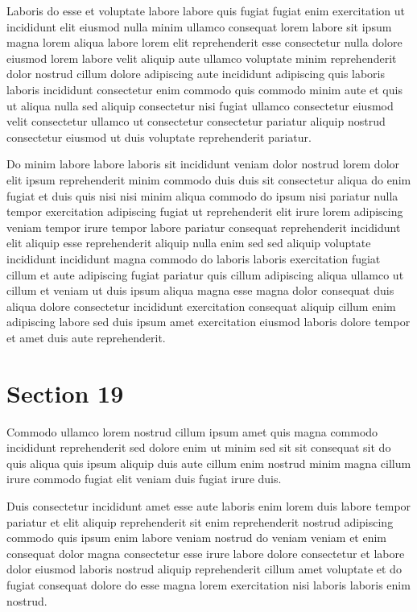 \documentclass{article}
\begin{document}
Laboris do esse et voluptate labore labore quis fugiat fugiat enim exercitation ut incididunt elit eiusmod nulla minim ullamco consequat lorem labore sit ipsum magna lorem aliqua labore lorem elit reprehenderit esse consectetur nulla dolore eiusmod lorem labore velit aliquip aute ullamco voluptate minim reprehenderit dolor nostrud cillum dolore adipiscing aute incididunt adipiscing quis laboris laboris incididunt consectetur enim commodo quis commodo minim aute et quis ut aliqua nulla sed aliquip consectetur nisi fugiat ullamco consectetur eiusmod velit consectetur ullamco ut consectetur consectetur pariatur aliquip nostrud consectetur eiusmod ut duis voluptate reprehenderit pariatur.

Do minim labore labore laboris sit incididunt veniam dolor nostrud lorem dolor elit ipsum reprehenderit minim commodo duis duis sit consectetur aliqua do enim fugiat et duis quis nisi nisi minim aliqua commodo do ipsum nisi pariatur nulla tempor exercitation adipiscing fugiat ut reprehenderit elit irure lorem adipiscing veniam tempor irure tempor labore pariatur consequat reprehenderit incididunt elit aliquip esse reprehenderit aliquip nulla enim sed sed aliquip voluptate incididunt incididunt magna commodo do laboris laboris exercitation fugiat cillum et aute adipiscing fugiat pariatur quis cillum adipiscing aliqua ullamco ut cillum et veniam ut duis ipsum aliqua magna esse magna dolor consequat duis aliqua dolore consectetur incididunt exercitation consequat aliquip cillum enim adipiscing labore sed duis ipsum amet exercitation eiusmod laboris dolore tempor et amet duis aute reprehenderit.

\section{Section 19}
Commodo ullamco lorem nostrud cillum ipsum amet quis magna commodo incididunt reprehenderit sed dolore enim ut minim sed sit sit consequat sit do quis aliqua quis ipsum aliquip duis aute cillum enim nostrud minim magna cillum irure commodo fugiat elit veniam duis fugiat irure duis.

Duis consectetur incididunt amet esse aute laboris enim lorem duis labore tempor pariatur et elit aliquip reprehenderit sit enim reprehenderit nostrud adipiscing commodo quis ipsum enim labore veniam nostrud do veniam veniam et enim consequat dolor magna consectetur esse irure labore dolore consectetur et labore dolor eiusmod laboris nostrud aliquip reprehenderit cillum amet voluptate et do fugiat consequat dolore do esse magna lorem exercitation nisi laboris laboris enim nostrud.
\end{document}
